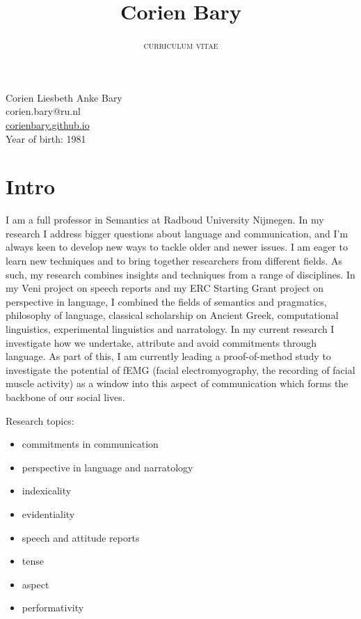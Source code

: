 \documentclass[a4paper,11pt]{article}
\title{\textbf{Corien Bary}}
\author{\Large{\textsc{curriculum vitae}}}
\date{}
\begin{document}
\maketitle


\noindent  Corien Liesbeth Anke Bary\\
corien.bary@ru.nl\\
\url{corienbary.github.io}\\
Year of birth: 1981\\

\section*{Intro}

I am a full professor in Semantics at Radboud University Nijmegen. In my research I address bigger questions about language and communication, and I'm always keen to develop new ways to tackle older and newer issues. I am eager to learn new techniques and to bring together researchers from different fields. As such, my research combines insights and techniques from a range of disciplines. In my Veni project on speech reports and my ERC Starting Grant project on perspective in language, I combined the fields of semantics and pragmatics, philosophy of language, classical scholarship on Ancient Greek, computational linguistics, experimental linguistics and narratology. In my current research I investigate how we undertake, attribute and avoid commitments through language. As part of this, I am currently leading a proof-of-method study to investigate the potential of fEMG (facial electromyography, the recording of facial muscle activity) as a window into this aspect of communication which forms the backbone of our social lives.\\\vspace{1em} 

\noindent Research topics:

\begin{itemize}
\item commitments in communication\vspace{-0.5em}
\item perspective in language and narratology\vspace{-0.5em}
\item indexicality\vspace{-0.5em}
\item evidentiality\vspace{-0.5em}
\item speech and attitude reports\vspace{-0.5em}
\item tense\vspace{-0.5em}
\item aspect\vspace{-0.5em}
\item performativity\vspace{-0.5em}
\end{itemize}
\end{document}
